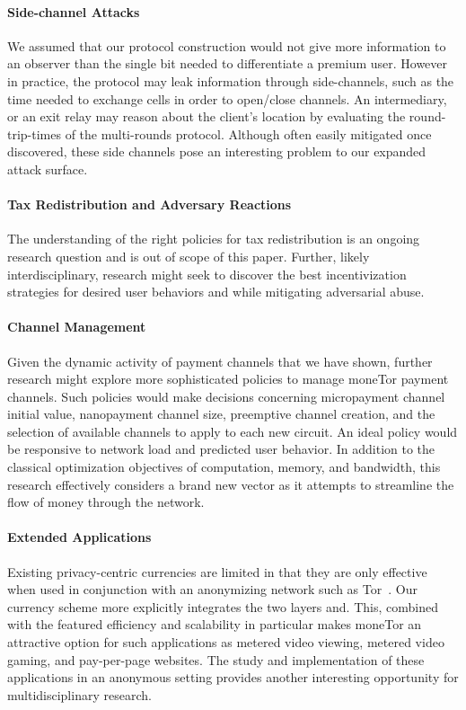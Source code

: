\paragraph*{Side-channel Attacks} We assumed that our protocol construction would
not give more information to an observer than the single bit needed to
differentiate a premium user. However in practice, the protocol may leak
information through side-channels, such as the time needed to exchange cells in
order to open/close channels. An intermediary, or an exit relay may reason about
the client's location by evaluating the round-trip-times of the multi-rounds
protocol. Although often easily mitigated once discovered, these side channels
pose an interesting problem to our expanded attack surface.

\paragraph*{Tax Redistribution and Adversary Reactions}
The understanding of the right policies for tax redistribution is an ongoing
research question and is out of scope of this paper. Further, likely
interdisciplinary, research might seek to discover the best incentivization
strategies for desired user behaviors and while mitigating adversarial abuse.

\paragraph*{Channel Management} Given the dynamic activity of payment
channels that we have shown, further research might explore more sophisticated
policies to manage moneTor payment channels. Such policies would make decisions
concerning micropayment channel initial value, nanopayment channel size,
preemptive channel creation, and the selection of available channels to apply to
each new circuit. An ideal policy would be responsive to network load and
predicted user behavior. In addition to the classical optimization objectives of
computation, memory, and bandwidth, this research effectively considers a brand
new vector as it attempts to streamline the flow of money through the network.

\paragraph*{Extended Applications} Existing privacy-centric currencies are
limited in that they are only effective when used in conjunction with an
anonymizing network such as Tor~\cite{sasson2014zerocash}. Our currency scheme
more explicitly integrates the two layers and. This, combined with the featured
efficiency and scalability in particular makes moneTor an attractive option for
such applications as metered video viewing, metered video gaming, and
pay-per-page websites. The study and implementation of these applications in an
anonymous setting provides another interesting opportunity for multidisciplinary
research.
